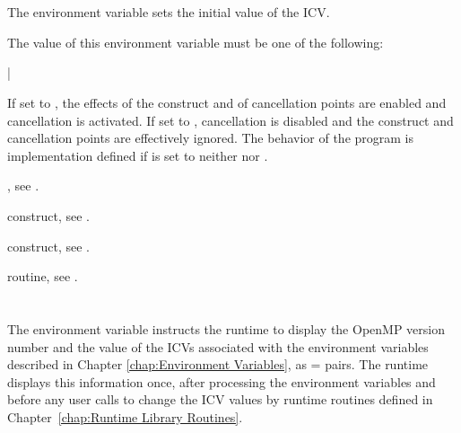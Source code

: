 \section{}
\label{sec:OMP_CANCELLATION}
The  environment variable sets the initial value 
of the  ICV.

The value of this environment variable must be one of the following:

{|}

If set to , the
effects of the  construct and of cancellation points are 
enabled and cancellation is activated. If set to , cancellation 
is disabled and the  construct and cancellation points are 
effectively ignored. The behavior of the program is implementation defined 
if  is set to neither  nor .

\begin{crossrefs}
\item {}, see .

\item {} construct, see .

\item {} construct, 
see .

\item {} routine, 
see .
\end{crossrefs}



\section{}
\label{sec:OMP_DISPLAY_ENV}
The  environment variable instructs the runtime to 
display the OpenMP version number and the value of the ICVs associated with 
the environment variables described in Chapter \ref{chap:Environment Variables},
as  =  pairs. The runtime displays this information 
once, after processing the environment variables and before any user calls
to change the ICV values by runtime routines defined in 
Chapter~\ref{chap:Runtime Library Routines}.

